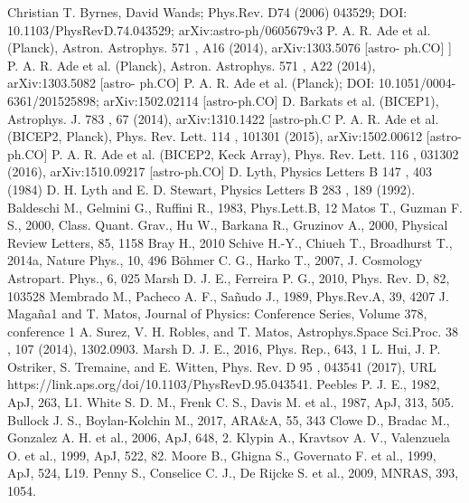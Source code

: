 \documentclass[amssymb,twocolumn,prd,nofootinbib,showpacs]{revtex4-1}
\begin{document}
\begin{thebibliography}{9}
 Christian T. Byrnes, David Wands;  Phys.Rev. D74 (2006) 043529; DOI:  	10.1103/PhysRevD.74.043529;  arXiv:astro-ph/0605679v3
  P. A. R. Ade
et al.
(Planck), Astron. Astrophys.
571
, A16 (2014), arXiv:1303.5076 [astro-
ph.CO]
 ]  P. A. R. Ade
et al.
(Planck), Astron. Astrophys.
571
, A22 (2014), arXiv:1303.5082 [astro-
ph.CO]
 P. A. R. Ade et al. (Planck); DOI: 	10.1051/0004-6361/201525898;  	arXiv:1502.02114 [astro-ph.CO]
  D. Barkats
et al.
(BICEP1), Astrophys. J.
783
, 67 (2014), arXiv:1310.1422 [astro-ph.C
 P. A. R. Ade
et al.
(BICEP2, Planck), Phys. Rev. Lett.
114
, 101301 (2015), arXiv:1502.00612
[astro-ph.CO]
  P.  A.  R.  Ade
et al.
(BICEP2,   Keck  Array),  Phys.  Rev.  Lett.
116
,  031302  (2016),
arXiv:1510.09217 [astro-ph.CO]
  D. Lyth, Physics Letters B
147
, 403  (1984)
  D. H. Lyth and E. D. Stewart, Physics Letters B
283
, 189  (1992).
 Baldeschi M., Gelmini G., Ruffini R., 1983, Phys.Lett.B, 12
 Matos T., Guzman F. S., 2000, Class. Quant. Grav., 
 Hu W., Barkana R., Gruzinov A., 2000, Physical Review Letters, 85, 1158
Bray H., 2010
Schive H.-Y., Chiueh T., Broadhurst T., 2014a, Nature Phys., 10, 496
Böhmer C. G., Harko T., 2007, J. Cosmology Astropart. Phys., 6, 025
Marsh D. J. E., Ferreira P. G., 2010, Phys. Rev. D, 82, 103528
 Membrado M., Pacheco A. F., Sañudo J., 1989, Phys.Rev.A, 39, 4207
 J. Magaña1 and T. Matos,  Journal of Physics: Conference Series, Volume 378, conference 1
  A. Surez, V. H. Robles, and T. Matos, Astrophys.Space
Sci.Proc.
38
, 107 (2014), 1302.0903.
 Marsh D. J. E., 2016, Phys. Rep., 643, 1
  L. Hui, J. P. Ostriker, S. Tremaine, and E. Witten, Phys. Rev. D
95
, 043541 (2017), URL
https://link.aps.org/doi/10.1103/PhysRevD.95.043541.
Peebles P. J. E., 1982, ApJ, 263, L1.
White S. D. M., Frenk C. S., Davis M. et al., 1987, ApJ, 313, 505.
Bullock J. S., Boylan-Kolchin M., 2017, ARA$\&$A, 55, 343
Clowe D., Bradac M., Gonzalez A. H. et al., 2006, ApJ, 648, 2.
Klypin A., Kravtsov A. V., Valenzuela O. et al., 1999, ApJ, 522, 82.
Moore B., Ghigna S., Governato F. et al., 1999, ApJ, 524, L19.
Penny S., Conselice C. J., De Rijcke S. et al., 2009, MNRAS, 393, 1054.

\end{thebibliography}
\end{document}
